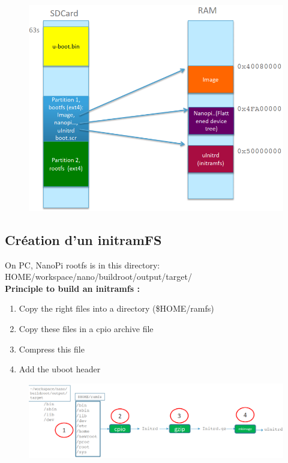 \documentclass[resume]{subfiles}
\begin{document}
\begin{figure}[H]
    \centering
    \includegraphics[width=1\columnwidth]{Figures/fileSystem/initRamFsBootSeq4.png}
    \label{fig:initRamFsBootSeq4}
\end{figure}

\subsection{Création d'un initramFS}
On PC, NanoPi rootfs is in this directory: HOME/workspace/nano/buildroot/output/target/\\
\textbf{Principle to build an initramfs :}
\begin{enumerate}
\item Copy the right files into a directory (\$HOME/ramfs)
\item Copy these files in a cpio archive file
\item Compress this file
\item Add the uboot header
\end{enumerate}

\begin{figure}[H]
    \centering
    \includegraphics[width=1\columnwidth]{Figures/fileSystem/builtInitRamFs.png}
    \label{fig:builtInitRamsFs}
\end{figure}
\end{document}

